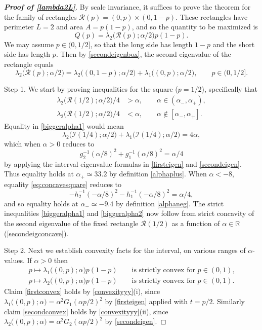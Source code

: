 \documentclass[12pt,reqno]{amsart}
\theoremstyle{definition}
\newcommand{\go}{G_1}
\newcommand{\gt}{G_2}
\newcommand{\R}{{\mathbb R}}
\begin{document}
\begin{proof}[\bf Proof of \autoref{lambda2L}] By scale invariance, it suffices to prove the theorem for the family of rectangles $\mathcal{R}(p) = (0,p) \times (0,1-p)$. These rectangles have perimeter $L=2$ and area $A=p(1-p)$, and so the quantity to be maximized is
\[
Q(p) = \lambda_2\big( \mathcal{R}(p);\alpha/2\big) p(1-p) .
\]
We may assume $p \in (0,1/2]$, so that the long side has length $1-p$ and the short side has length $p$. Then by  \autoref{secondeigenbox}, the second eigenvalue of the rectangle equals 
%
\begin{equation} \label{normalizedsecond}
\lambda_2\big( \mathcal{R}(p);\alpha/2\big) = \lambda_2\big( (0,1-p); \alpha/2\big) + \lambda_1\big( (0,p); \alpha/2\big) , \qquad p \in (0,1/2] .
\end{equation}
%

Step 1. We start by proving inequalities for the square ($p=1/2$), specifically that
%
\begin{align} 
\lambda_2\big( \mathcal{R}(1/2);\alpha/2\big)/4 & > \alpha, \qquad \alpha \in (\alpha_-,\alpha_+) , \label{biggeralpha1} \\
\lambda_2\big( \mathcal{R}(1/2);\alpha/2\big)/4 & < \alpha, \qquad \alpha \notin [\alpha_-,\alpha_+] . \label{biggeralpha2} 
\end{align}
%
Equality in \eqref{biggeralpha1} would mean
%
\begin{equation} \label{eq:concavesquare}
\lambda_2\big( \mathcal{I}(1/4) ; \alpha/2 \big) + \lambda_1\big( \mathcal{I}(1/4) ; \alpha/2 \big) = 4\alpha ,
\end{equation}
%
which when $\alpha>0$ reduces to 
\[
g_2^{-1}(\alpha/8)^2 + g_1^{-1}(\alpha/8)^2 = \alpha/4
\]
by applying the interval eigenvalue formulas in \autoref{firsteigen} and \autoref{secondeigen}. Thus equality holds at $\alpha_+ \simeq 33.2$ by definition \eqref{alphaplus}. When $\alpha<-8$, equality \eqref{eq:concavesquare} reduces to 
\[
-h_2^{-1}(-\alpha/8)^2 - h_1^{-1}(-\alpha/8)^2 = \alpha/4 , 
\]
and so equality holds at $\alpha_- \simeq -9.4$ by definition \eqref{alphaneg}. The strict inequalities \eqref{biggeralpha1} and \eqref{biggeralpha2} now follow from strict concavity of the second eigenvalue of the fixed rectangle $\mathcal{R}(1/2)$ as a function of $\alpha \in \R$ (\autoref{secondeigconcave}).  

\smallskip
Step 2. Next we establish convexity facts for the interval, on various ranges of $\alpha$-values. If $\alpha>0$ then 
%
\begin{align}
p \mapsto \lambda_1\big( (0,p); \alpha\big) p(1-p) \qquad \text{is strictly convex for $p \in (0,1)$,} \label{firstconvex} \\
p \mapsto \lambda_2\big( (0,p); \alpha\big) p(1-p) \qquad \text{is strictly convex for $p \in (0,1)$.} \label{secondconvex} 
\end{align}
%
Claim \eqref{firstconvex} holds by \autoref{convexityyy}(i), since $\lambda_1\big( (0,p); \alpha\big) = \alpha^2 \go( \alpha p/2)^2$ by \autoref{firsteigen} applied with $t=p/2$. Similarly claim \eqref{secondconvex} holds by \autoref{convexityyy}(ii), since $\lambda_2\big((0,p);\alpha \big) = \alpha^2 \gt(\alpha p/2)^2$ by \autoref{secondeigen}. 


\end{proof}
\end{document}
